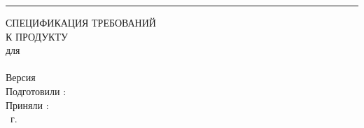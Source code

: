\begin{flushright}
    \rule{16cm}{5pt}\vskip1cm
    \begin{bfseries}
        \Huge{СПЕЦИФИКАЦИЯ ТРЕБОВАНИЙ\\ К ПРОДУКТУ}\\
        \vspace{1.5cm}
        для\\
        \vspace{1.5cm}
        \projectname\\
        \vspace{1.5cm}
        \LARGE{Версия \myversion}\\
        \vspace{1.5cm}
        Подготовили : \authors\\
        \vspace{1.5cm}
        Приняли : \assignee\\
        \vspace{1.5cm}
        \the\year~г.\\
    \end{bfseries}
\end{flushright}